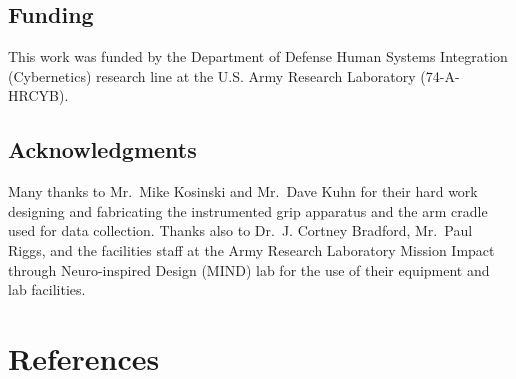 \documentclass[]{cik}%
\begin{document}
\hypertarget{funding}{%
\subsection{Funding}\label{funding}}

This work was funded by the Department of Defense Human Systems
Integration (Cybernetics) research line at the U.S. Army Research
Laboratory (74-A-HRCYB).

\hypertarget{acknowledgments}{%
\subsection{Acknowledgments}\label{acknowledgments}}

Many thanks to Mr.~Mike Kosinski and Mr.~Dave Kuhn for their hard work
designing and fabricating the instrumented grip apparatus and the arm
cradle used for data collection. Thanks also to Dr.~J. Cortney Bradford,
Mr.~Paul Riggs, and the facilities staff at the Army Research Laboratory
Mission Impact through Neuro-inspired Design (MIND) lab for the use of
their equipment and lab facilities.

\newpage

\hypertarget{references}{%
\section{References}\label{references}}
\end{document}
